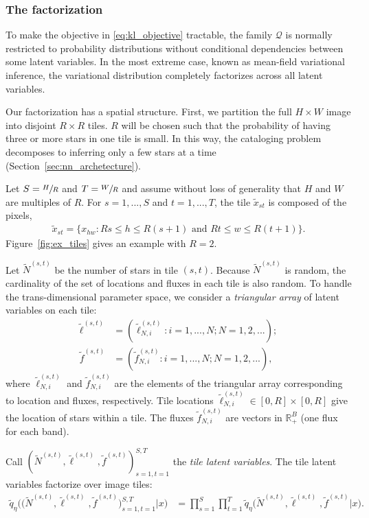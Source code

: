 \subsubsection{The factorization}
\label{sec:factorization}
To make the objective in \eqref{eq:kl_objective} tractable, the family $\mathcal{Q}$ is normally restricted to probability distributions 
without conditional dependencies between some latent variables. In the most extreme case, known as mean-field variational inference, the variational distribution completely factorizes across all latent variables. 

Our factorization has a spatial structure. 
First, we partition the full $H \times W$ image into disjoint $R \times R$ tiles. 
$R$ will be chosen such that the probability of having three or more stars in one tile is small. 
In this way, the cataloging problem decomposes to inferring only a few stars at a time (Section~\ref{sec:nn_archetecture}). 


Let $S = \sfrac{H}{R}$ and $T = \sfrac{W}{R}$ and assume without loss of generality that $H$ and $W$ are multiples of $R$.
For $s = 1, ..., S$ and $t = 1, ..., T$,
the tile $\tilde x_{st}$ is composed of the pixels,
\begin{align}
    \tilde x_{st} = \{x_{hw} : Rs \leq h \leq R(s+1) \text{ and } Rt \leq w \leq R(t+1)\}.
    \label{eq:tiles}
\end{align}
Figure~\ref{fig:ex_tiles} gives an example with $R = 2$. 

Let $\tilde N^{(s, t)}$ be the number of stars in tile $(s,t)$.
Because $\tilde N^{(s, t)}$ is random, 
the cardinality of the set of locations and fluxes in each tile
is also random. 
To handle the trans-dimensional parameter space, 
we consider a {\itshape triangular array} of latent variables
on each tile:
\begin{align}
    \tilde\ell^{(s, t)} &= (\tilde\ell_{N, i}^{(s, t)} : i = 1, ..., N; N = 1, 2, ...); \\
    \tilde f^{(s, t)} &= (\tilde f_{N, i}^{(s, t)} : i = 1, ..., N; N = 1, 2, ...),
\end{align}
where $\tilde\ell_{N, i}^{(s, t)}$ and $\tilde f_{N, i}^{(s, t)}$ are the elements of the triangular array corresponding to location and fluxes, respectively. 
Tile locations $\tilde\ell_{N, i}^{(s, t)} \in [0, R]\times[0, R]$ give the location of stars within a tile. The fluxes $\tilde f_{N, i}^{(s, t)}$ are vectors in $\mathbb{R}^B_+$ (one flux for each band). 

Call $(\tilde N^{(s, t)}, \tilde \ell^{(s, t)}, \tilde f^{(s, t)})_{s=1,t=1}^{S,T}$ the {\itshape tile latent variables}. The tile latent variables factorize over image tiles:
\begin{align}
    \tilde q_\eta\big( \big(\tilde N^{(s, t)}, \tilde \ell^{(s, t)}, \tilde f^{(s, t)}\big)_{s=1, t = 1}^{S, T}|x\big) 
    &=
    \prod_{s = 1}^S \prod_{t=1}^T
    \tilde q_\eta\big(\tilde N^{(s, t)}, \tilde \ell^{(s, t)}, \tilde f^{(s, t)} | x\big).
    \label{eq:factorize_patches}
\end{align}


